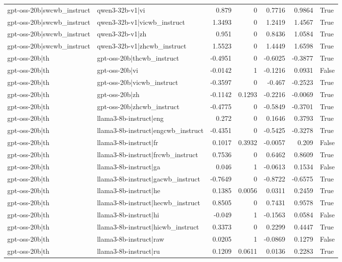 \begin{table}
\begin{tabular}{l l r r r r l}
gpt-oss-20b|swcwb_instruct & qwen3-32b-v1|vi & 0.879 & 0 & 0.7716 & 0.9864 & True \\
gpt-oss-20b|swcwb_instruct & qwen3-32b-v1|vicwb_instruct & 1.3493 & 0 & 1.2419 & 1.4567 & True \\
gpt-oss-20b|swcwb_instruct & qwen3-32b-v1|zh & 0.951 & 0 & 0.8436 & 1.0584 & True \\
gpt-oss-20b|swcwb_instruct & qwen3-32b-v1|zhcwb_instruct & 1.5523 & 0 & 1.4449 & 1.6598 & True \\
gpt-oss-20b|th & gpt-oss-20b|thcwb_instruct & -0.4951 & 0 & -0.6025 & -0.3877 & True \\
gpt-oss-20b|th & gpt-oss-20b|vi & -0.0142 & 1 & -0.1216 & 0.0931 & False \\
gpt-oss-20b|th & gpt-oss-20b|vicwb_instruct & -0.3597 & 0 & -0.467 & -0.2523 & True \\
gpt-oss-20b|th & gpt-oss-20b|zh & -0.1142 & 0.1293 & -0.2216 & -0.0069 & True \\
gpt-oss-20b|th & gpt-oss-20b|zhcwb_instruct & -0.4775 & 0 & -0.5849 & -0.3701 & True \\
gpt-oss-20b|th & llama3-8b-instruct|eng & 0.272 & 0 & 0.1646 & 0.3793 & True \\
gpt-oss-20b|th & llama3-8b-instruct|engcwb_instruct & -0.4351 & 0 & -0.5425 & -0.3278 & True \\
gpt-oss-20b|th & llama3-8b-instruct|fr & 0.1017 & 0.3932 & -0.0057 & 0.209 & False \\
gpt-oss-20b|th & llama3-8b-instruct|frcwb_instruct & 0.7536 & 0 & 0.6462 & 0.8609 & True \\
gpt-oss-20b|th & llama3-8b-instruct|ga & 0.046 & 1 & -0.0613 & 0.1534 & False \\
gpt-oss-20b|th & llama3-8b-instruct|gacwb_instruct & -0.7649 & 0 & -0.8722 & -0.6575 & True \\
gpt-oss-20b|th & llama3-8b-instruct|he & 0.1385 & 0.0056 & 0.0311 & 0.2459 & True \\
gpt-oss-20b|th & llama3-8b-instruct|hecwb_instruct & 0.8505 & 0 & 0.7431 & 0.9578 & True \\
gpt-oss-20b|th & llama3-8b-instruct|hi & -0.049 & 1 & -0.1563 & 0.0584 & False \\
gpt-oss-20b|th & llama3-8b-instruct|hicwb_instruct & 0.3373 & 0 & 0.2299 & 0.4447 & True \\
gpt-oss-20b|th & llama3-8b-instruct|raw & 0.0205 & 1 & -0.0869 & 0.1279 & False \\
gpt-oss-20b|th & llama3-8b-instruct|ru & 0.1209 & 0.0611 & 0.0136 & 0.2283 & True \\

\end{tabular}
\end{table}
